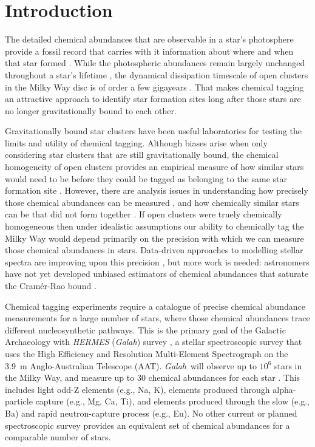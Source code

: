 \documentclass[twocolumn]{aastex62}
\newcommand{\project}[1]{\textsl{#1}}
\newcommand{\Galah}{\project{Galah}}
\begin{document}
\section{Introduction} \label{sec:intro}

The detailed chemical abundances that are observable in a star's photosphere provide a
fossil record that carries with it information about where and when that star
formed \citep{Freeman;Bland-Hawthorn:2002}. While the photospheric abundances remain largely unchanged throughout
a star's lifetime \citep[however see][]{Dotter:2017,Ness:2018b}, the dynamical 
dissipation timescale of open clusters in the Milky Way disc is of order a few 
gigayears \citep{Portegies-Zwart:1998}. That makes chemical tagging an attractive 
approach to identify star formation sites long after those stars are no longer 
gravitationally bound to each other.


Gravitationally bound star clusters have been useful laboratories for
testing the limits and utility of chemical tagging. Although biases arise when
only considering star clusters that are still gravitationally bound, the chemical
homogeneity of open clusters provides an empirical measure of how similar stars
would need to be before they could be tagged as belonging to the same
star formation site \citep{Bland-Hawthorn:2010b,Bland-Hawthorn:2010a,Mitschang:2014}. However, there are analysis
issues in understanding how precisely those chemical abundances can be measured
\citep{Bovy:2016}, and how chemically similar stars can be that did not form 
together \citep[doppleg\"angers;][]{Ness:2018}.
If open clusters were truely chemically homogeneous then under idealistic 
assumptions our ability to chemically tag the Milky Way would depend primarily
on the precision with which we can measure those chemical abundances in stars. 
Data-driven approaches to modelling stellar spectra are
improving upon this precision \citep{Ness:2015,Ness:2018a,Ness:2018b,
Casey:2016,Casey:2017,Ho:2017b,Ho:2017a,Leung;Bovy:2018,Ting:2019}, but more work is
needed: astronomers have not yet developed unbiased estimators of chemical
abundances that saturate the Cram\'er-Rao bound \citep{Cramer:1946,Rao:1945}.


Chemical tagging experiments require a catalogue of precise chemical abundance
measurements for a large number of stars,
where those chemical abundances trace different nucleosynthetic pathways.
This is the primary goal of the Galactic Archaeology with \project{HERMES} (\Galah) survey \citep{DeSilva:2015,Martell:2017,Buder:2018},
a stellar spectroscopic survey that uses the High Efficiency and Resolution 
Multi-Element Spectrograph \citep[\project{HERMES};][]{Sheinis:2015} on the 3.9~m Anglo-Australian 
Telescope (AAT).  \Galah\ will observe up to $10^6$ stars in the 
Milky Way, and measure up to 30 chemical abundances for each star \citep{Bland-Hawthorn:2016}. This includes
light odd-Z elements (e.g., Na, K), elements produced through
alpha-particle capture (e.g., Mg, Ca, Ti), and elements produced
through the slow (e.g., Ba) and rapid neutron-capture process
(e.g., Eu). No other current or planned spectroscopic survey provides an equivalent set of
chemical abundances for a comparable number of stars.
\end{document}

